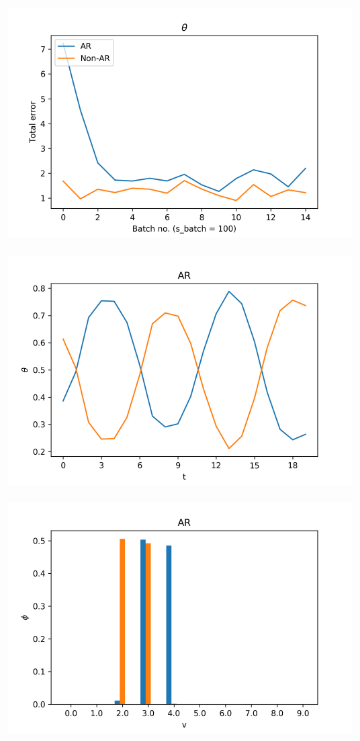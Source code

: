 \documentclass[12pt]{article}
\begin{document}
\begin{figure}[H]
  \centering
  \begin{subfigure}[b]{0.3\textwidth}
    \includegraphics[width=\linewidth]{performance_thetas_experiment-1|overlapping-yes_dataset-3.png}
  \end{subfigure}%
  \begin{subfigure}[b]{0.3\textwidth}
    \includegraphics[width=\linewidth]{latent_thetas_AR_experiment-1|overlapping-yes_dataset-3.png}
  \end{subfigure}%
  \begin{subfigure}[b]{0.3\textwidth}
    \includegraphics[width=\linewidth]{latent_phis_AR_experiment-1|overlapping-yes_dataset-3.png}
  \end{subfigure}%


\end{figure}
\end{document}
